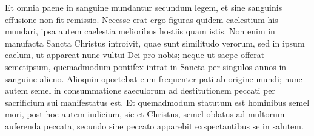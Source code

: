 \begin{biblechapter}
\begin{biblechapter}
\begin{biblechapter}
\begin{biblechapter}
\begin{biblechapter}
\begin{biblechapter}
\begin{biblechapter}
\begin{biblechapter}
\begin{biblechapter}
\verse Et omnia paene in sanguine mundantur secundum legem, et sine sanguinis effusione non fit remissio.
 \verse Necesse erat ergo figuras quidem caelestium his mundari, ipsa autem caelestia melioribus hostiis quam istis. 
\verse Non enim in manufacta Sancta Christus introivit, quae sunt similitudo verorum, sed in ipsum caelum, ut appareat nunc vultui Dei pro nobis; 
\verse neque ut saepe offerat semetipsum, quemadmodum pontifex intrat in Sancta per singulos annos in sanguine alieno. 
\verse Alioquin oportebat eum frequenter pati ab origine mundi; nunc autem semel in consummatione saeculorum ad destitutionem peccati per sacrificium sui manifestatus est. 
\verse Et quemadmodum statutum est hominibus semel mori, post hoc autem iudicium, 
\verse sic et Christus, semel oblatus ad multorum auferenda peccata, secundo sine peccato apparebit exspectantibus se in salutem.
 

\end{biblechapter}
\end{biblechapter}
\end{biblechapter}
\end{biblechapter}
\end{biblechapter}
\end{biblechapter}
\end{biblechapter}
\end{biblechapter}
\end{biblechapter}
